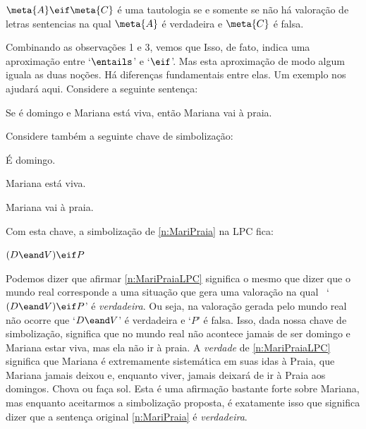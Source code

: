 	\begin{ebullet}
		\item[\textbf{Observação 3:}] $\meta{A} \eif \meta{C}$ é uma tautologia se e somente se não há valoração de letras sentencias na qual $\meta{A}$ é verdadeira e $\meta{C}$ é falsa.
	\end{ebullet}
Combinando as observações 1 e 3, vemos que
Isso, de fato, indica uma aproximação entre `$\entails$' e `$\eif$'.
Mas esta aproximação de modo algum iguala as duas noções.
Há diferenças fundamentais entre elas.
Um exemplo nos ajudará aqui.
Considere a seguinte sentença:
	\begin{earg}\setcounter{eargnum}{4}
		\item \label{n:MariPraia}Se é domingo e Mariana está viva, então Mariana vai à praia.
	\end{earg}
Considere também a seguinte chave de simbolização:
\begin{ekey}
	\item[D] É domingo.
	\item [V] Mariana está viva.
	\item[P] Mariana vai à praia.
\end{ekey}
Com esta chave, a simbolização de \ref{n:MariPraia} na LPC fica:
	\begin{earg}\setcounter{eargnum}{5}
		\item \label{n:MariPraiaLPC}$(D \eand V) \eif P$
	\end{earg}
Podemos dizer que afirmar \ref{n:MariPraiaLPC} significa o mesmo que dizer que o mundo real corresponde a uma situação que gera uma valoração na qual \mbox{ `$(D \eand V) \eif P$'} é \emph{verdadeira}.
Ou seja, na valoração gerada pelo mundo real não ocorre que `$D \eand V$' é verdadeira e `$P$' é falsa.
Isso, dada nossa chave de simbolização, significa que no mundo real não acontece jamais de ser domingo e Mariana estar viva, mas ela não ir à praia.
A \emph{verdade} de \ref{n:MariPraiaLPC} significa que Mariana é extremamente sistemática em suas idas à Praia, que Mariana jamais deixou e, enquanto viver, jamais deixará de ir à Praia aos domingos. Chova ou faça sol.
Esta é uma afirmação bastante forte sobre Mariana, mas enquanto aceitarmos a simbolização proposta, é exatamente isso que significa dizer que a sentença original \ref{n:MariPraia} é \emph{verdadeira}.

